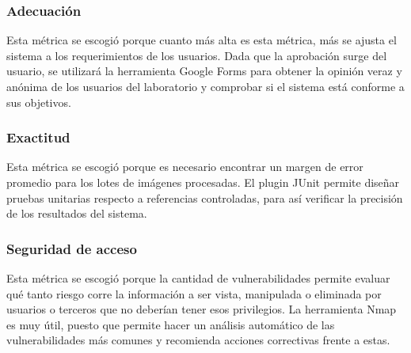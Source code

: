 \documentclass[12pt]{article}
\begin{document}
\vspace*{0.3in}
\subsubsection{Adecuación}
\vspace*{0.1in}
Esta métrica se escogió porque cuanto más alta es esta métrica, más se ajusta el sistema a los requerimientos de los usuarios. Dada que la aprobación surge del usuario, se utilizará la herramienta Google Forms para obtener la opinión veraz y anónima de los usuarios del laboratorio y comprobar si el sistema está conforme a sus objetivos.
\vspace*{0.3in}
\subsubsection{Exactitud}
\vspace*{0.1in}
Esta métrica se escogió porque es necesario encontrar un margen de error promedio para los lotes de imágenes procesadas. El plugin JUnit permite diseñar pruebas unitarias respecto a referencias controladas, para así verificar la precisión de los resultados del sistema.
\vspace*{0.3in}
\subsubsection{Seguridad de acceso}
\vspace*{0.1in}
Esta métrica se escogió porque la cantidad de vulnerabilidades permite evaluar qué tanto riesgo corre la información a ser vista, manipulada o eliminada por usuarios o terceros que no deberían tener esos privilegios. La herramienta Nmap es muy útil, puesto que permite hacer un análisis automático de las vulnerabilidades más comunes y recomienda acciones correctivas frente a estas.

\vspace*{0.3in}
\end{document}
